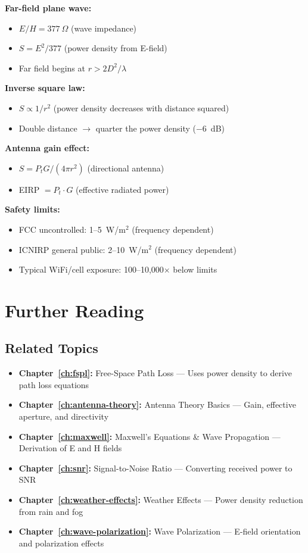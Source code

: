 \textbf{Far-field plane wave:}
\begin{itemize}
\item $E/H = 377~\Omega$ (wave impedance)
\item $S = E^2/377$ (power density from E-field)
\item Far field begins at $r > 2D^2/\lambda$
\end{itemize}

\textbf{Inverse square law:}
\begin{itemize}
\item $S \propto 1/r^2$ (power density decreases with distance squared)
\item Double distance $\rightarrow$ quarter the power density ($-6$~dB)
\end{itemize}

\textbf{Antenna gain effect:}
\begin{itemize}
\item $S = P_t G / (4\pi r^2)$ (directional antenna)
\item EIRP $= P_t \cdot G$ (effective radiated power)
\end{itemize}

\textbf{Safety limits:}
\begin{itemize}
\item FCC uncontrolled: 1--5~W/m$^2$ (frequency dependent)
\item ICNIRP general public: 2--10~W/m$^2$ (frequency dependent)
\item Typical WiFi/cell exposure: 100--10,000$\times$ below limits
\end{itemize}

\section{Further Reading}

\subsection{Related Topics}

\begin{itemize}
\item \textbf{Chapter~\ref{ch:fspl}:} Free-Space Path Loss --- Uses power density to derive path loss equations
\item \textbf{Chapter~\ref{ch:antenna-theory}:} Antenna Theory Basics --- Gain, effective aperture, and directivity
\item \textbf{Chapter~\ref{ch:maxwell}:} Maxwell's Equations \& Wave Propagation --- Derivation of E and H fields
\item \textbf{Chapter~\ref{ch:snr}:} Signal-to-Noise Ratio --- Converting received power to SNR
\item \textbf{Chapter~\ref{ch:weather-effects}:} Weather Effects --- Power density reduction from rain and fog
\item \textbf{Chapter~\ref{ch:wave-polarization}:} Wave Polarization --- E-field orientation and polarization effects
\end{itemize}

